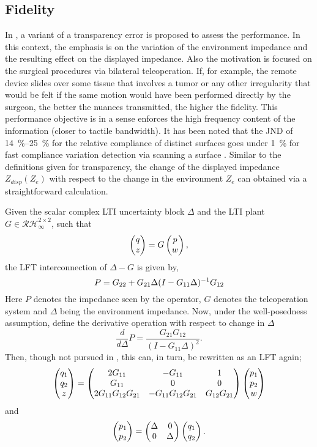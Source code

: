 \subsection{Fidelity}
In \cite{cavusoglu}, a variant of a transparency error is proposed to assess the performance. In this context, 
the emphasis is on the variation of the environment impedance and the resulting effect on the displayed impedance. 
Also the motivation is focused on the surgical procedures via bilateral teleoperation. If, for 
example, the remote device slides over some tissue that involves a tumor or any other irregularity that would be felt
if the same motion would have been performed directly by the surgeon, the better the nuances transmitted, the higher
the fidelity. This performance objective is in a sense enforces the high frequency content of the information (closer
to tactile bandwidth). It has been noted that the JND of \SIrange{14}{25}{\percent} for the relative compliance 
of distinct surfaces goes under \SI{1}{\percent} for fast compliance variation detection via scanning a surface
\cite{dhruvtendick}. Similar to the definitions given for transparency, the change of the displayed impedance 
$Z_{disp}(Z_e)$ with respect to the change in the environment $Z_e$ can obtained via a straightforward calculation.


Given the scalar complex LTI uncertainty block $\Delta$ and the LTI plant $G\in\mathcal{RH}_\infty^{2\times 2}$, 
such that 
\[
\begin{pmatrix}q\\z\end{pmatrix} = G\begin{pmatrix}p\\w\end{pmatrix},
\]
the LFT interconnection of $\Delta-G$ is given by, 
\[
P = G_{22}+G_{21}\Delta(I-G_{11}\Delta)^{-1}G_{12}
\]
Here $P$ denotes the impedance seen by the operator, $G$ denotes the teleoperation system and $\Delta$ being the 
environment impedance. Now, under the well-posedness assumption, define the derivative operation with respect to change in $\Delta$
\[
\frac{d}{d\Delta} P = \frac{G_{21}G_{12}}{(I-G_{11}\Delta)^2}.
\]
Then, though not pursued in \cite{cavusoglu}, this can, in turn, be rewritten as an LFT again;
\[
\begin{pmatrix}q_1\\q_2\\z\end{pmatrix} = \begin{pmatrix}2G_{11} &-G_{11} &1\\G_{11} &0 &0\\ 2G_{11}G_{12}G_{21} &-G_{11}G_{12}G_{21} &G_{12}G_{21}\end{pmatrix}\begin{pmatrix}p_1\\p_2\\w\end{pmatrix}
\]
and 
\[
\begin{pmatrix}p_1\\p_2\end{pmatrix} = \begin{pmatrix}\Delta &0\\0 &\Delta\end{pmatrix}\begin{pmatrix}q_1\\q_2\end{pmatrix}.
\]

